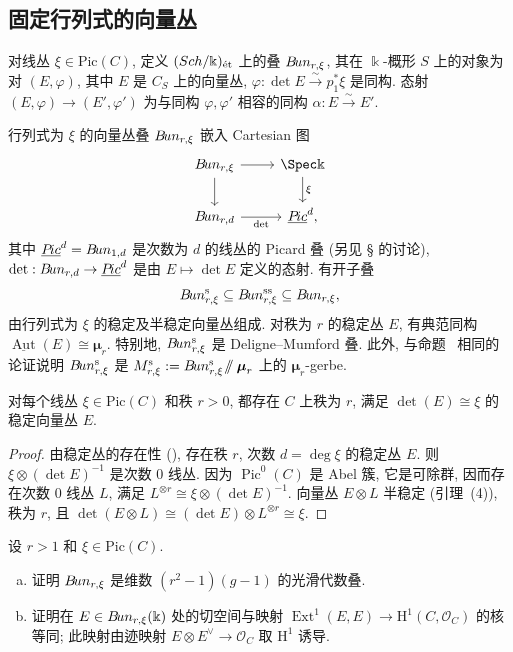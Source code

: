 \subsection{固定行列式的向量丛}\label{src:9.2.7-subsection}
\begin{definition}\label{src:9.2.27}
对线丛 $\xi\in\mathrm{Pic}(C)$, 定义 $(Sch/\Bbbk)_{\text{ét}}$ 上的叠 $B\!un_{r,\xi}$, 其在 $\Bbbk$-概形 $S$ 上的对象为对 $(E,\varphi)$, 其中 $E$ 是 $C_S$ 上的向量丛, $\varphi:\det E\xrightarrow{\sim}p_1^*\xi$ 是同构. 态射 $(E,\varphi)\to(E',\varphi')$ 为与同构 $\varphi,\varphi'$ 相容的同构 $\alpha:E\xrightarrow{\sim}E'$.
\end{definition}
行列式为 $\xi$ 的向量丛叠 $B\!un_{r,\xi}$ 嵌入 Cartesian 图
\begin{equation}\label{src:9.2.28}
\begin{tikzcd}[ampersand replacement=\&]
\cBun_{r,\xi}\arrow[r]\arrow[d]\&\Spec\Bbbk\arrow[d,"\xi"]\\
\cBun_{r,d}\arrow[r,"\det"']\&\underline{\mathcal P\!ic}^{d},
\end{tikzcd}
\end{equation}
其中 $\underline{P\!ic}^d=B\!un_{1,d}$ 是次数为 $d$ 的线丛的 Picard 叠 (另见 \S{} 的讨论), $\det:B\!un_{r,d}\to\underline{P\!ic}^d$ 是由 $E\mapsto\det E$ 定义的态射. 有开子叠
\[
B\!un_{r,\xi}^{\mathrm s}\subseteq B\!un_{r,\xi}^{\mathrm{ss}}\subseteq B\!un_{r,\xi},
\]
由行列式为 $\xi$ 的稳定及半稳定向量丛组成. 对秩为 $r$ 的稳定丛 $E$, 有典范同构 $\underline{\operatorname{Aut}}(E)\cong\boldsymbol\mu_r$. 特别地, $B\!un_{r,\xi}^{\mathrm s}$ 是 Deligne--Mumford 叠. 此外, 与命题~ 相同的论证说明 $B\!un_{r,\xi}^{\mathrm s}$ 是 $M_{r,\xi}^{\mathrm s}:=B\!un_{r,\xi}^{\mathrm s}\!\mathbin{/\mkern-6mu/}\boldsymbol\mu_r$ 上的 $\boldsymbol\mu_r$-gerbe.
\begin{proposition}\label{src:9.2.29}
对每个线丛 $\xi\in\mathrm{Pic}(C)$ 和秩 $r>0$, 都存在 $C$ 上秩为 $r$, 满足 $\det(E)\cong\xi$ 的稳定向量丛 $E$.
\end{proposition}
\begin{proof}
由稳定丛的存在性 (), 存在秩 $r$, 次数 $d=\deg\xi$ 的稳定丛 $E$. 则 $\xi\otimes(\det E)^{-1}$ 是次数 $0$ 线丛. 因为 $\operatorname{Pic}^0(C)$ 是 Abel 簇, 它是可除群, 因而存在次数 $0$ 线丛 $L$, 满足 $L^{\otimes r}\cong\xi\otimes(\det E)^{-1}$. 向量丛 $E\otimes L$ 半稳定 (引理~(4)), 秩为 $r$, 且 $\det(E\otimes L)\cong(\det E)\otimes L^{\otimes r}\cong\xi$.
\end{proof}
\begin{exercise}[有益练习]\label{src:9.2.30}
设 $r>1$ 和 $\xi\in\mathrm{Pic}(C)$.
\begin{enumerate}[(a)]
\item 证明 $B\!un_{r,\xi}$ 是维数 $(r^2-1)(g-1)$ 的光滑代数叠.
\item 证明在 $E\in B\!un_{r,\xi}(\Bbbk)$ 处的切空间与映射 $\operatorname{Ext}^1(E,E)\to\mathrm H^1(C,\mathcal O_C)$ 的核等同; 此映射由迹映射 $E\otimes E^\vee\to\mathcal O_C$ 取 $\mathrm H^1$ 诱导.
\end{enumerate}
\end{exercise}
